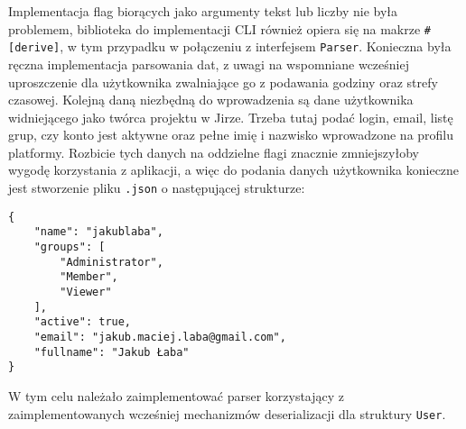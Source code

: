 Implementacja flag biorących jako argumenty tekst lub liczby nie była problemem, biblioteka do implementacji CLI również opiera się na makrze
\texttt{\#[derive]}, w tym przypadku w połączeniu z interfejsem \texttt{Parser}.
Konieczna była ręczna implementacja parsowania dat, z uwagi na wspomniane wcześniej uproszczenie dla użytkownika zwalniające go z podawania godziny oraz strefy czasowej.
Kolejną daną niezbędną do wprowadzenia są dane użytkownika widniejącego jako twórca projektu w Jirze.
Trzeba tutaj podać login, email, listę grup, czy konto jest aktywne oraz pełne imię i nazwisko wprowadzone na profilu platformy.
Rozbicie tych danych na oddzielne flagi znacznie zmniejszyłoby wygodę korzystania z aplikacji, a więc do podania danych użytkownika konieczne jest stworzenie pliku \texttt{.json}
o następującej strukturze:
\begin{lstlisting}[caption=Przykładowy plik z danymi użytkownika]
{
    "name": "jakublaba",
    "groups": [
        "Administrator",
        "Member",
        "Viewer"
    ],
    "active": true,
    "email": "jakub.maciej.laba@gmail.com",
    "fullname": "Jakub Łaba"
}
\end{lstlisting}
W tym celu należało zaimplementować parser korzystający z zaimplementowanych wcześniej mechanizmów deserializacji dla struktury \texttt{User}.
